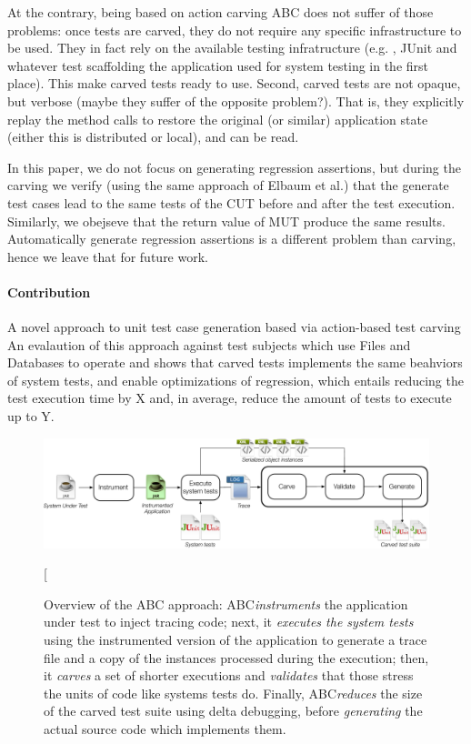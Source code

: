 \documentclass[10pt,conference]{IEEEtran}
\makeatletter
\gdef\xxx{\@ifnextchar[\xxx@lab\xxx@nolab}
\newcommand{\abc}{\textsf{ABC}\xspace}
\makeatother
\begin{document}
At the contrary,  being based on action carving \abc does not suffer of those problems: once tests are carved, they do not require any specific infrastructure to be used. They in fact rely on the available testing infratructure (e.g. , JUnit and whatever test scaffolding the application used for system testing in the first place). This make carved tests ready to use. Second, carved tests are not opaque, but verbose (maybe they suffer of the opposite problem?).
That is, they explicitly replay the method calls to restore the original (or similar) application state (either this is distributed or local), and can be read.

In this paper, we do not focus on generating regression assertions, but during the carving we verify (using the same approach of Elbaum et al.) that the generate test cases lead to the same tests of the CUT before and after the test execution. Similarly, we obejseve that the return value of MUT produce the same results. Automatically generate regression assertions is a different problem than carving, hence we leave that for future work.

\paragraph{Contribution}
A novel approach to unit test case generation based via action-based test carving
An evalaution of this approach against test subjects which use Files and Databases to operate and shows that carved tests
implements the same beahviors of system tests, and enable optimizations of regression, which entails reducing the test execution time by X and, in average, reduce the amount of tests to execute up to Y.


\begin{figure}[h!]
\centering
\includegraphics[width=\textwidth]{overview}
\caption{Overview of the \abc approach: \abc \emph{instruments} the application under test to inject tracing code; next, it \emph{executes the system tests} using the instrumented version of the application to generate a trace file and a copy of the instances processed during the execution; 
then, it \emph{carves} a set of shorter executions and \emph{validates} that those stress the units of code like systems tests
do. Finally, \abc \emph{reduces} the size of the carved test suite using delta debugging, before \emph{generating} the actual source code which implements them.}
\xxx{Add delta debugging again}
\label{fig:overview}
\end{figure}
\end{document}
